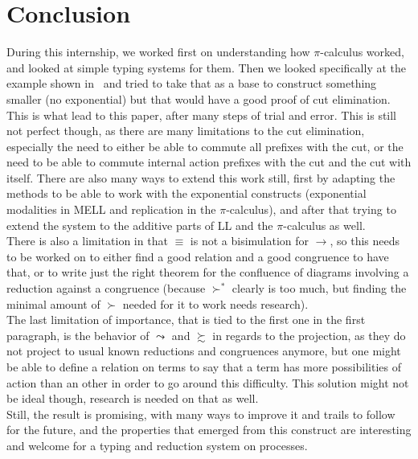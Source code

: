 \section*{Conclusion}

During this internship, we worked first on understanding how $\pi$-calculus worked, and looked at simple typing systems for them. Then we looked specifically at the example shown in~\cite{beffara-2015-unifying} and tried to take that as a base to construct something smaller (no exponential) but that would have a good proof of cut elimination. This is what lead to this paper, after many steps of trial and error. This is still not perfect though, as there are many limitations to the cut elimination, especially the need to either be able to commute all prefixes with the cut, or the need to be able to commute internal action prefixes with the cut and the cut with itself. There are also many ways to extend this work still, first by adapting the methods to be able to work with the exponential constructs (exponential modalities in MELL and replication in the $\pi$-calculus), and after that trying to extend the system to the additive parts of LL and the $\pi$-calculus as well.\\

There is also a limitation in that $\equiv$ is not a bisimulation for $\to$, so this needs to be worked on to either find a good relation and a good congruence to have that, or to write just the right theorem for the confluence of diagrams involving a reduction against a congruence (because $\succ^*$ clearly is too much, but finding the minimal amount of $\succ$ needed for it to work needs research).\\

The last limitation of importance, that is tied to the first one in the first paragraph, is the behavior of $\leadsto$ and $\succsim$ in regards to the projection, as they do not project to usual known reductions and congruences anymore, but one might be able to define a relation on terms to say that a term has more possibilities of action than an other in order to go around this difficulty. This solution might not be ideal though, research is needed on that as well.\\

Still, the result is promising, with many ways to improve it and trails to follow for the future, and the properties that emerged from this construct are interesting and welcome for a typing and reduction system on processes.\\~\\

